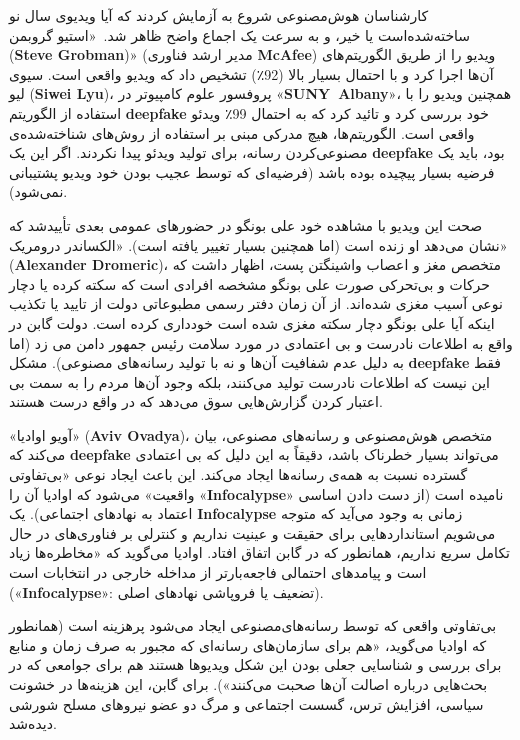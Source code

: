 کارشناسان هوش‌مصنوعی شروع به آزمایش کردند که آیا ویدیوی سال نو ساخته‌شده‌است یا خیر، و به سرعت یک اجماع واضح ظاهر شد.\ «استیو گروبمن (\textenglish{\textbf{Steve Grobman}})» (مدیر ارشد فناوری \textenglish{\textbf{McAfee}}) ویدیو را از طریق الگوریتم‌های آن‌ها اجرا کرد و با احتمال بسیار بالا (92٪) تشخیص داد که ویدیو واقعی است.
سیوی لیو (\textenglish{\textbf{Siwei Lyu}})، پروفسور علوم کامپیوتر در «\textenglish{\textbf{\mbox{SUNY Albany}}}»، همچنین ویدیو را با استفاده از الگوریتم \textenglish{\textbf{deepfake}} خود بررسی کرد و تائید کرد که به احتمال 99٪ ویدئو واقعی است.
الگوریتم‌ها، هیچ مدرکی مبنی بر استفاده از روش‌های شناخته‌شده‌ی مصنوعی‌کردن رسانه، برای تولید ویدئو پیدا نکردند.
اگر این یک \textenglish{\textbf{deepfake}} بود، باید یک فرضیه بسیار پیچیده بوده باشد (فرضیه‌ای که توسط عجیب بودن خود ویدیو پشتیبانی نمی‌شود).

صحت این ویدیو با مشاهده خود علی بونگو در حضورهای عمومی بعدی تأیید‌شد که نشان می‌دهد او زنده است (اما همچنین بسیار تغییر یافته است).
«الکساندر درومریک» (\textenglish{\textbf{Alexander Dromeric}})، متخصص مغز و اعصاب واشینگتن پست، اظهار داشت که حرکات و بی‌تحرکی صورت علی بونگو مشخصه افرادی است که سکته کرده یا دچار نوعی آسیب مغزی شده‌اند.
از آن زمان دفتر رسمی مطبوعاتی دولت از تایید یا تکذیب اینکه آیا علی بونگو دچار سکته مغزی شده است خودداری کرده است.
دولت گابن در واقع به اطلاعات نادرست و بی اعتمادی در مورد سلامت رئیس جمهور دامن می زد (اما به دلیل عدم شفافیت آن‌ها و نه با تولید رسانه‌های مصنوعی).
مشکل \textenglish{\textbf{deepfake}} فقط این نیست که اطلاعات نادرست تولید می‌کنند، بلکه وجود آن‌ها مردم را به سمت بی اعتبار کردن گزارش‌هایی سوق می‌دهد که در واقع درست هستند.

«آویو اوادیا» (\textenglish{\textbf{Aviv Ovadya}})، متخصص هوش‌مصنوعی و رسانه‌های مصنوعی، بیان می‌کند که \textenglish{\textbf{deepfake}} می‌تواند بسیار خطرناک باشد، دقیقاً به این دلیل که بی اعتمادی گسترده نسبت به همه‌ی رسانه‌ها ایجاد می‌کند.
این باعث ایجاد نوعی «بی‌تفاوتی واقعیت» می‌شود که اوادیا آن را «\textenglish{\textbf{Infocalypse}}» نامیده است (از دست دادن اساسی اعتماد به نهادهای اجتماعی).
یک \textenglish{\textbf{Infocalypse}} زمانی به وجود می‌آید که متوجه می‌شویم استانداردهایی برای حقیقت و عینیت نداریم و کنترلی بر فناوری‌های در حال تکامل سریع نداریم، همانطور که در گابن اتفاق افتاد.
اوادیا می‌گوید که «مخاطره‌ها زیاد است و پیامدهای احتمالی فاجعه‌بارتر از مداخله خارجی در انتخابات است («\textenglish{\textbf{Infocalypse}}»: تضعیف یا فروپاشی نهادهای اصلی).

بی‌تفاوتی واقعی که توسط رسانه‌های‌مصنوعی ایجاد می‌شود پرهزینه است (همانطور که اوادیا می‌گوید، «هم برای سازمان‌های رسانه‌ای که مجبور به صرف زمان و منابع برای بررسی و شناسایی جعلی بودن این شکل ویدیوها هستند هم برای جوامعی که در بحث‌هایی درباره اصالت آن‌ها صحبت می‌کنند»).
برای گابن، این هزینه‌ها در خشونت سیاسی، افزایش ترس، گسست اجتماعی و مرگ دو عضو نیروهای مسلح شورشی دیده‌شد.
\newline
\newline



